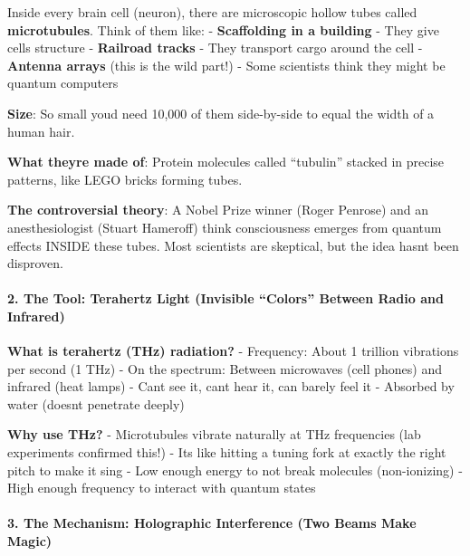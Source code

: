 Inside every brain cell (neuron), there are microscopic hollow tubes
called \textbf{microtubules}. Think of them like: - \textbf{Scaffolding
in a building} - They give cells structure - \textbf{Railroad tracks} -
They transport cargo around the cell - \textbf{Antenna arrays} (this is
the wild part!) - Some scientists think they might be quantum computers

\textbf{Size}: So small you\textquotesingle d need 10,000 of them
side-by-side to equal the width of a human hair.

\textbf{What they\textquotesingle re made of}: Protein molecules called
``tubulin'' stacked in precise patterns, like LEGO bricks forming tubes.

\textbf{The controversial theory}: A Nobel Prize winner (Roger Penrose)
and an anesthesiologist (Stuart Hameroff) think consciousness emerges
from quantum effects INSIDE these tubes. Most scientists are skeptical,
but the idea hasn\textquotesingle t been disproven.

\paragraph{\texorpdfstring{2. \textbf{The Tool: Terahertz Light
(Invisible ``Colors'' Between Radio and
Infrared)}}{2. The Tool: Terahertz Light (Invisible ``Colors'' Between Radio and Infrared)}}\label{the-tool-terahertz-light-invisible-colors-between-radio-and-infrared}

\textbf{What is terahertz (THz) radiation?} - Frequency: About 1
trillion vibrations per second (1 THz) - On the spectrum: Between
microwaves (cell phones) and infrared (heat lamps) -
Can\textquotesingle t see it, can\textquotesingle t hear it, can barely
feel it - Absorbed by water (doesn\textquotesingle t penetrate deeply)

\textbf{Why use THz?} - Microtubules vibrate naturally at THz
frequencies (lab experiments confirmed this!) - It\textquotesingle s
like hitting a tuning fork at exactly the right pitch to make it sing -
Low enough energy to not break molecules (non-ionizing) - High enough
frequency to interact with quantum states

\paragraph{\texorpdfstring{3. \textbf{The Mechanism: Holographic
Interference (Two Beams Make
Magic)}}{3. The Mechanism: Holographic Interference (Two Beams Make Magic)}}\label{the-mechanism-holographic-interference-two-beams-make-magic}

